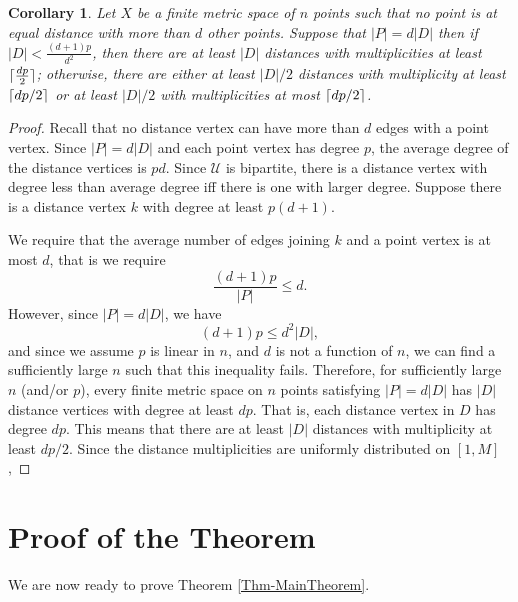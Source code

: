 \documentclass[12pt]{article}
\DeclarePairedDelimiter\ceil{\lceil}{\rceil}
\newtheorem{cor}[thm]{Corollary}
\theoremstyle{definition}
\begin{document}
	\begin{cor}
		Let $X$ be a finite metric space of $n$ points such that no point is at equal distance with more than $d$ other points.  Suppose that $|P| = d|D|$ then if $|D| < \tfrac{(d+1)p}{d^2}$, then there are at least $|D|$ distances with multiplicities at least $\ceil{\tfrac{dp}{2}}$; otherwise, there are either at least $|D|/2$ distances with multiplicity at least $\ceil{dp/2}$ or at least $|D|/2$ with multiplicities at most $\ceil{dp/2}$.
	\end{cor}
	\begin{proof}
		Recall that no distance vertex can have more than $d$ edges with a point vertex.  Since $|P| = d|D|$ and each point vertex has degree $p$, the average degree of the distance vertices is $pd$.  Since $\mathcal{U}$ is bipartite, there is a distance vertex with degree less than average degree iff there is one with larger degree.  Suppose there is a distance vertex $k$ with degree at least $p(d + 1)$.
		
		We require that the average number of edges joining $k$ and a point vertex is at most $d$, that is we require
		$$\frac{(d+1)p}{|P|} \leq d.$$
		However, since $|P| = d|D|$, we have
		$$(d+1)p \leq d^2|D|,$$
		and since we assume $p$ is linear in $n$, and $d$ is not a function of $n$, we can find a sufficiently large $n$ such that this inequality fails.  Therefore, for sufficiently large $n$ (and/or $p$), every finite metric space on $n$ points satisfying $|P| = d|D|$ has $|D|$ distance vertices with degree at least $dp$.  That is, each distance vertex in $D$ has degree $dp$.  This means that there are at least $|D|$ distances with multiplicity at least $dp/2$.  Since the distance multiplicities are uniformly distributed on $[1,M]$,
	\end{proof}
	
	\section{Proof of the Theorem}
	
	We are now ready to prove Theorem \ref{Thm-MainTheorem}.
	
\end{document}
